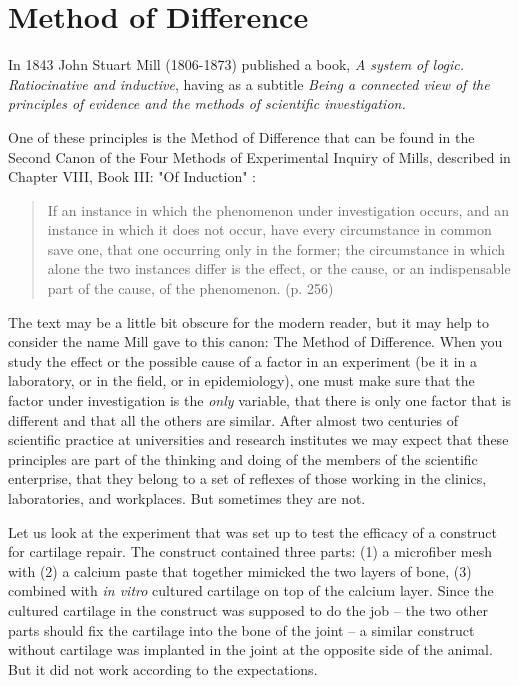 \documentclass[twocolumn, reflection, authordate, serif, seplic]{jote-article}
\begin{document}
 {}\section*{Method of Difference} 

In 1843 John Stuart Mill (1806-1873) published a book, \emph{A system of logic. Ratiocinative and inductive}, having as a subtitle \emph{Being a connected view of the principles of evidence and the methods of scientific investigation.}

One of these principles is the Method of Difference that can be found in the Second Canon of the Four Methods of Experimental Inquiry of Mills, described in Chapter VIII, Book III: "Of Induction" \parencite{Mill1884}:
\begin{quote}
If an instance in which the phenomenon under investigation occurs, and an instance in which it does not occur, have every circumstance in common save one, that one occurring only in the former; the circumstance in which alone the two instances differ is the effect, or the cause, or an indispensable part of the cause, of the phenomenon. (p. 256) \end{quote}
The text may be a little bit obscure for the modern reader, but it may help to consider the name Mill gave to this canon: The Method of Difference. When you study the effect or the possible cause of a factor in an experiment (be it in a laboratory, or in the field, or in epidemiology), one must make sure that the factor under investigation is the \emph{only} variable, that there is only one factor that is different and that all the others are similar. After almost two centuries of scientific practice at universities and research institutes we may expect that these principles are part of the thinking and doing of the members of the scientific enterprise, that they belong to a set of reflexes of those working in the clinics, laboratories, and workplaces. But sometimes they are not.

Let us look at the experiment that was set up to test the efficacy of a construct for cartilage repair. The construct contained three parts: (1) a microfiber mesh with (2) a calcium paste that together mimicked the two layers of bone, (3) combined with \emph{in vitro} cultured cartilage on top of the calcium layer. Since the cultured cartilage in the construct was supposed to do the job -- the two other parts should fix the cartilage into the bone of the joint -- a similar construct without cartilage was implanted in the joint at the opposite side of the animal. But it did not work according to the expectations.
\end{document}
